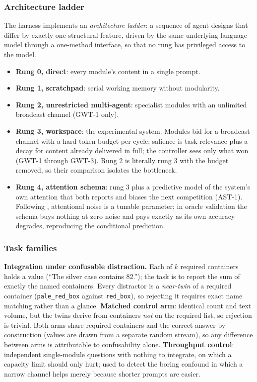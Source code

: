 \documentclass[11pt]{article}
\begin{document}
\subsubsection{Architecture ladder}

The harness implements an \emph{architecture ladder}: a sequence of agent designs
that differ by exactly one structural feature, driven by the same underlying
language model through a one-method interface, so that no rung has privileged
access to the model.

\begin{itemize}
  \item \textbf{Rung 0, direct}: every module's content in a single prompt.
  \item \textbf{Rung 1, scratchpad}: serial working memory without modularity.
  \item \textbf{Rung 2, unrestricted multi-agent}: specialist modules with an
  unlimited broadcast channel (GWT-1 only).
  \item \textbf{Rung 3, workspace}: the experimental system. Modules bid for a
  broadcast channel with a hard token budget per cycle; salience is task-relevance
  plus a decay for content already delivered in full; the controller sees only
  what won (GWT-1 through GWT-3). Rung 2 is literally rung 3 with the budget
  removed, so their comparison isolates the bottleneck.
  \item \textbf{Rung 4, attention schema}: rung 3 plus a predictive model of the
  system's own attention that both reports and biases the next competition
  (AST-1). Following \cite{piefke2024}, attentional noise is a tunable parameter;
  in oracle validation the schema buys nothing at zero noise and pays exactly as
  its own accuracy degrades, reproducing the conditional prediction.
\end{itemize}

\subsubsection{Task families}

\textbf{Integration under confusable distraction.} Each of $k$ required
containers holds a value (``The silver case contains 82.''); the task is to
report the sum of exactly the named containers. Every distractor is a
\emph{near-twin} of a required container (\texttt{pale\_red\_box} against
\texttt{red\_box}), so rejecting it requires exact name matching rather than a
glance. \textbf{Matched control arm}: identical count and text volume, but the
twins derive from containers \emph{not} on the required list, so rejection is
trivial. Both arms share required containers and the correct answer by
construction (values are drawn from a separate random stream), so any difference
between arms is attributable to confusability alone. \textbf{Throughput control}:
independent single-module questions with nothing to integrate, on which a
capacity limit should only hurt; used to detect the boring confound in which a
narrow channel helps merely because shorter prompts are easier.
\end{document}
